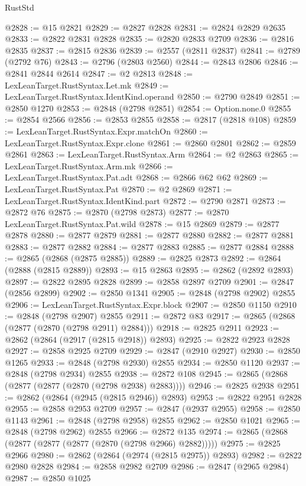 \begin{lexlean}{RustStd}
\begin{coremodule}
@2828 := @15 @2821
@2829 := @2827 @2828
@2831 := @2824 @2829 @2635
@2833 := @2822 @2831 @2828
@2835 := @2820 @2833 @2709
@2836 := @2816 @2835
@2837 := @2815 @2836
@2839 := @2557 (@2811 @2837)
@2841 := @2789 (@2792 @76)
@2843 := @2796 (@2803 @2560)
@2844 := @2843 @2806
@2846 := @2841 @2844 @2614
@2847 := @2 @2813
@2848 := LexLeanTarget.RustSyntax.Let.mk
@2849 := LexLeanTarget.RustSyntax.IdentKind.operand
@2850 := @2790 @2849
@2851 := @2850 @1270
@2853 := @2848 (@2798 @2851)
@2854 := Option.none.{0}
@2855 := @2854 @2566
@2856 := @2853 @2855
@2858 := @2817 (@2818 @108)
@2859 := LexLeanTarget.RustSyntax.Expr.matchOn
@2860 := LexLeanTarget.RustSyntax.Expr.clone
@2861 := @2860 @2801
@2862 := @2859 @2861
@2863 := LexLeanTarget.RustSyntax.Arm
@2864 := @2 @2863
@2865 := LexLeanTarget.RustSyntax.Arm.mk
@2866 := LexLeanTarget.RustSyntax.Pat.adt
@2868 := @2866 @62 @62
@2869 := LexLeanTarget.RustSyntax.Pat
@2870 := @2 @2869
@2871 := LexLeanTarget.RustSyntax.IdentKind.part
@2872 := @2790 @2871
@2873 := @2872 @76
@2875 := @2870 (@2798 @2873)
@2877 := @2870 LexLeanTarget.RustSyntax.Pat.wild
@2878 := @15 @2869
@2879 := @2877 @2878
@2880 := @2877 @2879
@2881 := @2877 @2880
@2882 := @2877 @2881
@2883 := @2877 @2882
@2884 := @2877 @2883
@2885 := @2877 @2884
@2888 := @2865 (@2868 (@2875 @2885))
@2889 := @2825 @2873
@2892 := @2864 (@2888 (@2815 @2889))
@2893 := @15 @2863
@2895 := @2862 (@2892 @2893)
@2897 := @2822 @2895 @2828
@2899 := @2858 @2897 @2709
@2901 := @2847 (@2856 @2899)
@2902 := @2850 @1341
@2905 := @2848 (@2798 @2902) @2855
@2906 := LexLeanTarget.RustSyntax.Expr.block
@2907 := @2850 @1150
@2910 := @2848 (@2798 @2907) @2855
@2911 := @2872 @83
@2917 := @2865 (@2868 (@2877 (@2870 (@2798 @2911) @2884)))
@2918 := @2825 @2911
@2923 := @2862 (@2864 (@2917 (@2815 @2918)) @2893)
@2925 := @2822 @2923 @2828
@2927 := @2858 @2925 @2709
@2929 := @2847 (@2910 @2927)
@2930 := @2850 @1265
@2933 := @2848 (@2798 @2930) @2855
@2934 := @2850 @1120
@2937 := @2848 (@2798 @2934) @2855
@2938 := @2872 @108
@2945 := @2865 (@2868 (@2877 (@2877 (@2870 (@2798 @2938) @2883))))
@2946 := @2825 @2938
@2951 := @2862 (@2864 (@2945 (@2815 @2946)) @2893)
@2953 := @2822 @2951 @2828
@2955 := @2858 @2953 @2709
@2957 := @2847 (@2937 @2955)
@2958 := @2850 @1143
@2961 := @2848 (@2798 @2958) @2855
@2962 := @2850 @1021
@2965 := @2848 (@2798 @2962) @2855
@2966 := @2872 @135
@2974 := @2865 (@2868 (@2877 (@2877 (@2877 (@2870 (@2798 @2966) @2882)))))
@2975 := @2825 @2966
@2980 := @2862 (@2864 (@2974 (@2815 @2975)) @2893)
@2982 := @2822 @2980 @2828
@2984 := @2858 @2982 @2709
@2986 := @2847 (@2965 @2984)
@2987 := @2850 @1025

\end{coremodule}
\end{lexlean}
